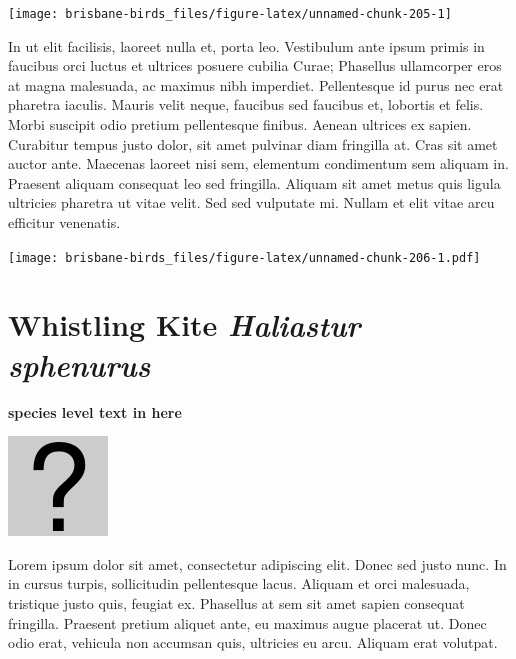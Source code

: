 \documentclass[]{book}
\let\origfigure\figure
\let\endorigfigure\endfigure
\renewenvironment{figure}[1][2] {
  \expandafter\origfigure\expandafter[H]
} {
  \endorigfigure
}
\begin{document}
\begin{figure}
\texttt{[image: brisbane-birds\_files/figure-latex/unnamed-chunk-205-1]} \caption{insert figure caption}\label{fig:unnamed-chunk-205}
\end{figure}

In ut elit facilisis, laoreet nulla et, porta leo. Vestibulum ante ipsum
primis in faucibus orci luctus et ultrices posuere cubilia Curae;
Phasellus ullamcorper eros at magna malesuada, ac maximus nibh
imperdiet. Pellentesque id purus nec erat pharetra iaculis. Mauris velit
neque, faucibus sed faucibus et, lobortis et felis. Morbi suscipit odio
pretium pellentesque finibus. Aenean ultrices ex sapien. Curabitur
tempus justo dolor, sit amet pulvinar diam fringilla at. Cras sit amet
auctor ante. Maecenas laoreet nisi sem, elementum condimentum sem
aliquam in. Praesent aliquam consequat leo sed fringilla. Aliquam sit
amet metus quis ligula ultricies pharetra ut vitae velit. Sed sed
vulputate mi. Nullam et elit vitae arcu efficitur venenatis.

\begin{figure}
\centering
\texttt{[image: brisbane-birds\_files/figure-latex/unnamed-chunk-206-1.pdf]}
\caption{\label{fig:unnamed-chunk-206}insert figure caption}
\end{figure}

\section{\texorpdfstring{Whistling Kite \emph{Haliastur
sphenurus}}{Whistling Kite Haliastur sphenurus}}\label{whistling-kite-haliastur-sphenurus}

\textbf{species level text in here}

\begin{figure}
\centering
\includegraphics{assets/missing.png}
\caption{No image for species}
\end{figure}

Lorem ipsum dolor sit amet, consectetur adipiscing elit. Donec sed justo
nunc. In in cursus turpis, sollicitudin pellentesque lacus. Aliquam et
orci malesuada, tristique justo quis, feugiat ex. Phasellus at sem sit
amet sapien consequat fringilla. Praesent pretium aliquet ante, eu
maximus augue placerat ut. Donec odio erat, vehicula non accumsan quis,
ultricies eu arcu. Aliquam erat volutpat.
\end{document}
